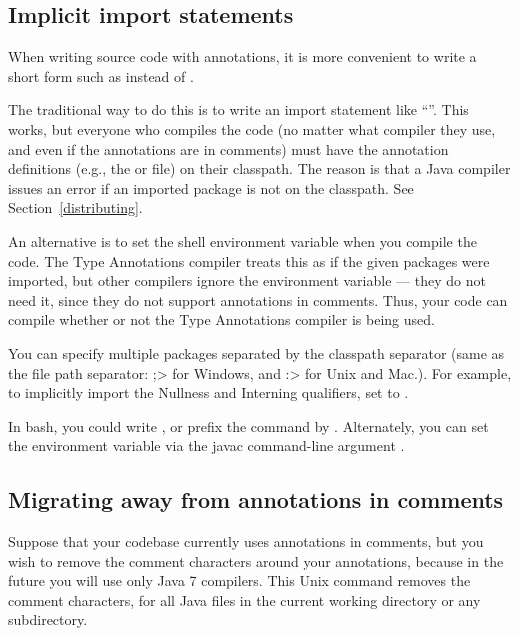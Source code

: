 \subsection{Implicit import statements\label{implicit-import-statements}}

When writing source code with annotations, it is more convenient to write a
short form such as  instead of
.

The traditional way to do this is to write an import statement like
``''.  This works, but everyone who
compiles the code (no matter what compiler they use, and even if the
annotations are in comments) must have the annotation definitions (e.g.,
the  or  file) on their
classpath.  The reason is that a Java compiler issues an error if an
imported package is not on the classpath.  See Section~\ref{distributing}.

\label{jsr308_imports}

An alternative is to set the shell environment variable
 when you compile the code.
The Type Annotations compiler treats this as if the given packages were
imported, but other compilers
ignore the
 environment variable --- they do not need it, since
they do not support annotations in comments.  Thus, your code can compile
whether or not the Type Annotations compiler is being used.

You can specify multiple packages separated by the classpath separator
(same as the file path separator:  \<;> for Windows, and \<:> for Unix and
Mac.).  For example, to implicitly import the Nullness and Interning
qualifiers, set  to
.

In bash, you could write , or prefix the 
command by  .
Alternately, you can set the environment variable via the javac
command-line argument .


\subsection{Migrating away from annotations in comments}

Suppose that your codebase currently uses annotations in comments, but you
wish to remove the comment characters around your annotations, because in
the future you will use only Java 7 compilers.  This Unix command removes
the comment characters, for all Java files in the current
working directory or any subdirectory.

